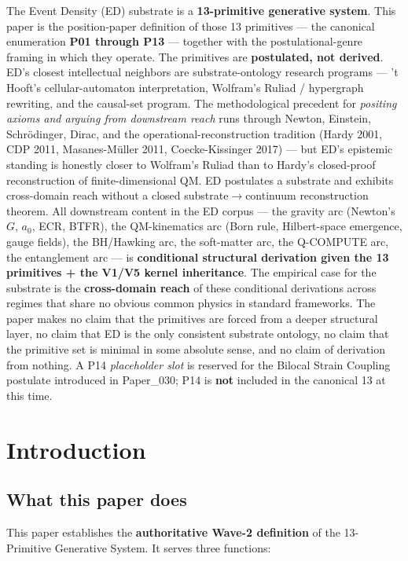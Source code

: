 \documentclass[11pt,a4paper]{article}
\begin{document}
The Event Density (ED) substrate is a \textbf{13-primitive generative system}. This paper is the position-paper definition of those 13 primitives --- the canonical enumeration \textbf{P01 through P13} --- together with the postulational-genre framing in which they operate. The primitives are \textbf{postulated, not derived}. ED's closest intellectual neighbors are substrate-ontology research programs --- 't Hooft's cellular-automaton interpretation, Wolfram's Ruliad / hypergraph rewriting, and the causal-set program. The methodological precedent for \emph{positing axioms and arguing from downstream reach} runs through Newton, Einstein, Schr\"odinger, Dirac, and the operational-reconstruction tradition (Hardy 2001, CDP 2011, Masanes-M\"uller 2011, Coecke-Kissinger 2017) --- but ED's epistemic standing is honestly closer to Wolfram's Ruliad than to Hardy's closed-proof reconstruction of finite-dimensional QM. ED postulates a substrate and exhibits cross-domain reach without a closed substrate$\to$continuum reconstruction theorem. All downstream content in the ED corpus --- the gravity arc (Newton's $G$, $a_0$, ECR, BTFR), the QM-kinematics arc (Born rule, Hilbert-space emergence, gauge fields), the BH/Hawking arc, the soft-matter arc, the Q-COMPUTE arc, the entanglement arc --- is \textbf{conditional structural derivation given the 13 primitives + the V1/V5 kernel inheritance}. The empirical case for the substrate is the \textbf{cross-domain reach} of these conditional derivations across regimes that share no obvious common physics in standard frameworks. The paper makes no claim that the primitives are forced from a deeper structural layer, no claim that ED is the only consistent substrate ontology, no claim that the primitive set is minimal in some absolute sense, and no claim of derivation from nothing. A P14 \emph{placeholder slot} is reserved for the Bilocal Strain Coupling postulate introduced in Paper\_030; P14 is \textbf{not} included in the canonical 13 at this time.

\section{Introduction}

\subsection{What this paper does}

This paper establishes the \textbf{authoritative Wave-2 definition} of the 13-Primitive Generative System. It serves three functions:
\end{document}
